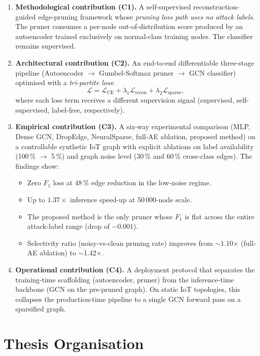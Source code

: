 \documentclass[11pt,a4paper]{report}
\theoremstyle{definition}
\theoremstyle{remark}
\begin{document}
\begin{enumerate}[leftmargin=1.6em]
\item \textbf{Methodological contribution (C1).}
A self-supervised reconstruction-guided edge-pruning framework whose
\emph{pruning loss path uses no attack labels}. The pruner consumes a
per-node out-of-distribution score produced by an autoencoder trained
exclusively on normal-class training nodes. The classifier remains
supervised.

\item \textbf{Architectural contribution (C2).}
An end-to-end differentiable three-stage pipeline (Autoencoder $\to$
Gumbel-Softmax pruner $\to$ GCN classifier) optimised with a
\emph{tri-partite loss}:
\[\mathcal{L}=\mathcal{L}_{\text{CE}}
            +\lambda_1\mathcal{L}_{\text{recon}}
            +\lambda_2\mathcal{L}_{\text{sparse}},\]
where each loss term receives a different supervision signal
(supervised, self-supervised, label-free, respectively).

\item \textbf{Empirical contribution (C3).}
A six-way experimental comparison (MLP, Dense GCN, DropEdge, NeuralSparse,
full-AE ablation, proposed method) on a controllable synthetic IoT graph
with explicit ablations on label availability (100\,\% $\to$ 5\,\%) and
graph noise level (30\,\% and 60\,\% cross-class edges). The findings
show:
\begin{itemize}[leftmargin=1.6em]
\item Zero $F_1$ loss at 48\,\% edge reduction in the low-noise regime.
\item Up to $1.37\times$ inference speed-up at 50\,000-node scale.
\item The proposed method is the only pruner whose $F_1$ is flat across
the entire attack-label range (drop of $-0.001$).
\item Selectivity ratio (noisy-vs-clean pruning rate) improves from
$\sim$1.10$\times$ (full-AE ablation) to $\sim$1.42$\times$.
\end{itemize}

\item \textbf{Operational contribution (C4).}
A deployment protocol that separates the training-time scaffolding
(autoencoder, pruner) from the inference-time backbone (GCN on the
pre-pruned graph). On static IoT topologies, this collapses the
production-time pipeline to a single GCN forward pass on a sparsified
graph.
\end{enumerate}

\section{Thesis Organisation}
\end{document}
